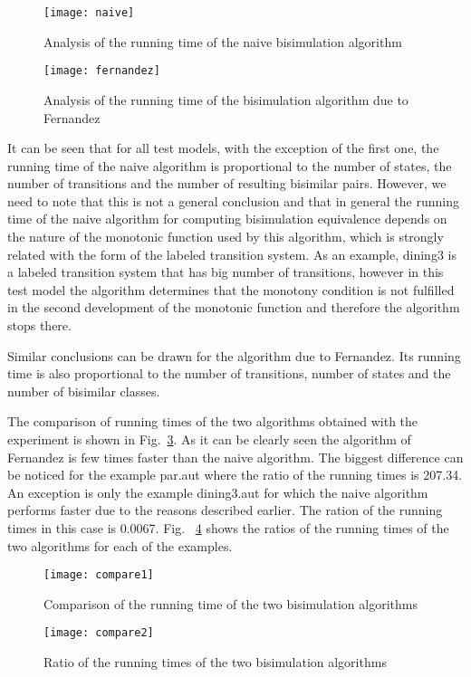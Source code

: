 \begin{figure}[h]
\centering
\texttt{[image: naive]}
\caption{Analysis of the running time of the naive bisimulation algorithm}
\label{fig:naiveAnalysis}
\end{figure}

\begin{figure}[h]
\centering
\texttt{[image: fernandez]}
\caption{Analysis of the running time of the bisimulation algorithm due to Fernandez}
\label{fig:fernandezAnalysis}
\end{figure}

It can be seen that for all test models, with the exception of the first one, the running time of the naive algorithm is proportional to the number of states, the number of transitions and the number of resulting bisimilar pairs. However, we need to note that this is not a general conclusion and that in general the running time of the naive algorithm for computing bisimulation equivalence depends on the nature of the monotonic function used by this algorithm, which is strongly related with the form of the labeled transition system. As an example, dining3 is a labeled transition system that has big number of transitions, however in this test model the algorithm determines that the monotony condition is not fulfilled in the second development of the monotonic function and therefore the algorithm stops there.

Similar conclusions can be drawn for the algorithm due to Fernandez. Its running time is also proportional to the number of transitions, number of states and the number of bisimilar classes. 

The comparison of running times of the two algorithms obtained with the experiment is shown in Fig.~\ref{fig:comparison1}. As it can be clearly seen the algorithm of Fernandez is few times faster than the naive algorithm. The biggest difference can be noticed for the example par.aut where the ratio of the running times is 207.34. An exception is only the example dining3.aut for which the naive algorithm performs faster due to the reasons described earlier. The ration of the running times in this case is 0.0067. Fig.~ \ref{fig:comparison2} shows the ratios of the running times of the two algorithms for each of the examples.

\begin{figure}[h]
\centering
\texttt{[image: compare1]}
\caption{Comparison of the running time of the two bisimulation algorithms}
\label{fig:comparison1}
\end{figure}

\begin{figure}[h]
\centering
\texttt{[image: compare2]}
\caption{Ratio of the running times of the two bisimulation algorithms}
\label{fig:comparison2}
\end{figure}